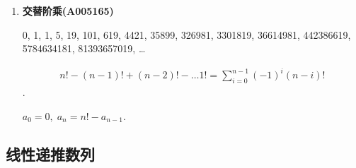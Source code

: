 \begin{enumerate}
    \item \textbf{交替阶乘(A005165)}
          
          0, 1, 1, 5, 19, 101, 619, 4421, 35899, 326981, 3301819, 36614981, 442386619, 5784634181, 81393657019, \dots
          
          \[
              \begin{aligned} n! - (n - 1)! + (n - 2)! - \dots 1! = \sum_{i = 0} ^ {n - 1} (-1)^i (n - i)! \end{aligned}
          \].
          
          \( a_0 = 0,\; a_n = n! - a_{n - 1} \).
\end{enumerate}

\subsection{线性递推数列}

